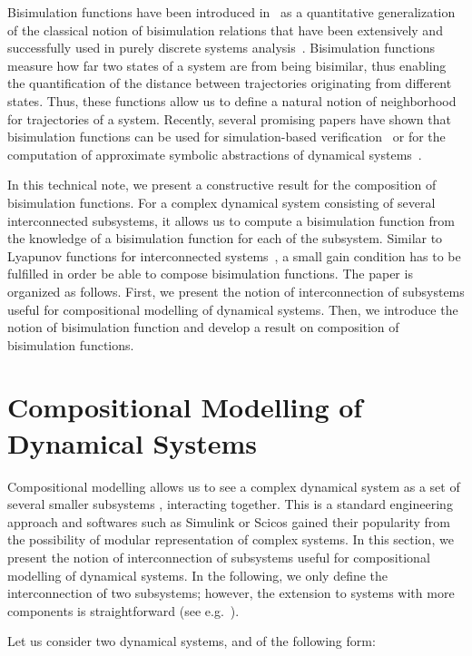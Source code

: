 \documentclass[a4paper,12pt,twoside]{article}
\begin{document}
Bisimulation functions have been introduced in~\cite{Girard2007}
as a quantitative generalization of the classical notion of
bisimulation relations that have been extensively and successfully
used in purely discrete systems analysis~\cite{Clarke99}. Bisimulation
functions measure how far two states of a system are from being
bisimilar, thus enabling the quantification of
the distance between trajectories originating from different states. 
Thus, these functions allow us to define a natural notion of neighborhood for trajectories of a system.
Recently, several promising papers have shown that bisimulation functions can be used for simulation-based verification~\cite{Girard06,Girard07a,Julius07,Lerda08} or for the computation of approximate symbolic abstractions of dynamical systems~\cite{Girard07,Pola07}. 

In this technical note, we present a constructive result for the composition of bisimulation functions.
For a complex dynamical system consisting of several interconnected subsystems,
it allows us to compute a bisimulation function from the knowledge of a bisimulation function for each of the subsystem.
Similar to Lyapunov functions for interconnected systems~\cite{Jiang96},
a small gain condition has to be fulfilled in order be able to compose bisimulation functions. The paper is organized
as follows. First, we present the notion of interconnection of subsystems useful for compositional modelling of dynamical
systems. Then, we introduce the notion of bisimulation function and develop a result on composition of bisimulation
functions.


\section{Compositional Modelling of Dynamical Systems}

Compositional modelling allows us to see a complex dynamical system  
as a set of several smaller subsystems , interacting together.
This is a standard engineering approach and softwares such as Simulink or Scicos gained their
popularity from the possibility of modular representation of complex systems. 
In this section, we present the notion of interconnection of subsystems useful for compositional modelling of dynamical
systems.
In the following, we only define the interconnection of two subsystems; however, the extension to systems with 
more components is straightforward (see e.g.~\cite{Tazaki08}).

Let us consider two dynamical systems,  and  of the following form:
\end{document}
